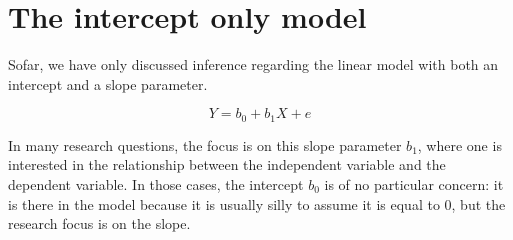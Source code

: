 \documentclass[]{book}\usepackage[]{graphicx}\usepackage[]{color}
\begin{document}
% 
% 
% 
% 
% 
% 
% 
% 
% 
% 
% 
% 
% 
% 
% 
% 
% 


\section{The intercept only model}\label{sec:intercept_only}

Sofar, we have only discussed inference regarding the linear model with both an intercept and a slope parameter. 

\begin{equation}
Y = b_0 + b_1 X + e
\end{equation}

In many research questions, the focus is on this slope parameter $b_1$, where one is interested in the relationship between the independent variable and the dependent variable.  In those cases, the intercept $b_0$ is of no particular concern: it is there in the model because it is usually silly to assume it is equal to 0, but the research focus is on the slope. 
\end{document}
